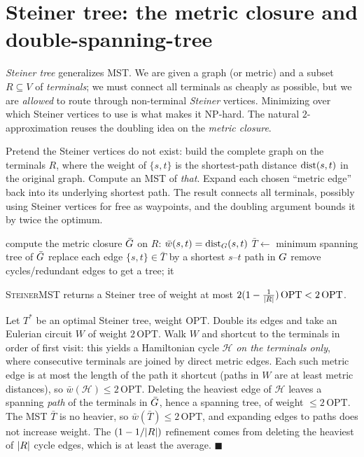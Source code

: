 \section{Steiner tree: the metric closure and double-spanning-tree}

\emph{Steiner tree} generalizes MST. We are given a graph (or metric) and a subset $R\subseteq V$ of
\emph{terminals}; we must connect all terminals as cheaply as possible, but we are \emph{allowed} to
route through non-terminal \emph{Steiner} vertices. Minimizing over which Steiner vertices to use is
what makes it \textsf{NP}-hard. The natural $2$-approximation reuses the doubling idea on the
\emph{metric closure}.

\begin{intuitionbox}
Pretend the Steiner vertices do not exist: build the complete graph on the terminals $R$, where the
weight of $\{s,t\}$ is the shortest-path distance $\operatorname{dist}(s,t)$ in the original graph. Compute an MST
of \emph{that}. Expand each chosen ``metric edge'' back into its underlying shortest path. The result
connects all terminals, possibly using Steiner vertices for free as waypoints, and the doubling
argument bounds it by twice the optimum.
\end{intuitionbox}

\begin{algorithm}[H]
\caption{\textsc{SteinerMST}$(\Gph,w,R)$}\label{ch38:alg-steiner}
\DontPrintSemicolon
compute the metric closure $\bar{G}$ on $R$: $\bar w(s,t)=\operatorname{dist}_G(s,t)$\;
$\bar T \gets$ minimum spanning tree of $\bar{G}$\;
replace each edge $\{s,t\}\in\bar T$ by a shortest $s$--$t$ path in $G$\;
remove cycles/redundant edges to get a tree; \Return it\;
\end{algorithm}

\begin{theorem}\label{ch38:thm-steiner2}
\textsc{SteinerMST} returns a Steiner tree of weight at most $2(1-\tfrac1{\lvert R\rvert})\,\mathrm{OPT}<2\,\mathrm{OPT}$.
\end{theorem}

\begin{whybox}
Let $T^\ast$ be an optimal Steiner tree, weight $\mathrm{OPT}$. Double its edges and take an Eulerian
circuit $W$ of weight $2\,\mathrm{OPT}$. Walk $W$ and shortcut to the terminals in order of first
visit: this yields a Hamiltonian cycle $\mathcal{H}$ \emph{on the terminals only}, where consecutive
terminals are joined by direct metric edges. Each such metric edge is at most the length of the path
it shortcut (paths in $W$ are at least metric distances), so $\bar w(\mathcal{H})\le 2\,\mathrm{OPT}$.
Deleting the heaviest edge of $\mathcal{H}$ leaves a spanning \emph{path} of the terminals in
$\bar{G}$, hence a spanning tree, of weight $\le 2\,\mathrm{OPT}$. The MST $\bar T$ is no heavier, so
$\bar w(\bar T)\le 2\,\mathrm{OPT}$, and expanding edges to paths does not increase weight. The
$(1-1/\lvert R\rvert)$ refinement comes from deleting the heaviest of $\lvert R\rvert$ cycle edges, which is at least
the average. $\blacksquare$
\end{whybox}

